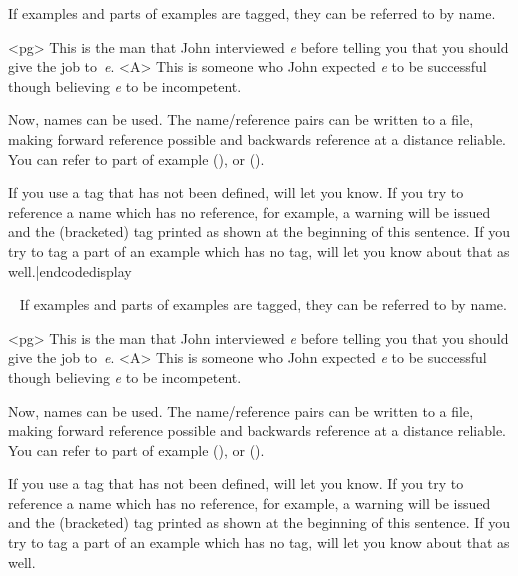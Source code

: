 
\vfil\eject
{}

\codedisplay
If examples and parts of examples are tagged, they can be
referred to by name.

\pex<pg>
\a This is the man that John interviewed {\sl e\/} before
telling you that you should give the job to~{\sl e}.
\a<A> This is someone who John expected {\sl e\/} to be successful
though believing {\sl e\/} to be incompetent.
\xe

Now, names can be used.  The name/reference pairs can be written
to a file, making forward reference possible and backwards
reference at a distance reliable.  You can refer to part
 of example (), or ().

If you use a tag that has not been defined, \expex\/ will
let you know. If you try to reference a name which has no
reference,  for example, a warning will be issued
and the (bracketed) tag printed as shown at the beginning of this
sentence.  If you try to tag a part of an example which has no
tag, \expex\/ will let you know about that as
well.|endcodedisplay

\framedisplay~
\bigskip
If examples and parts of examples are tagged, they can be
referred to by name.

\pex<pg>
\a This is the man that John interviewed {\sl e\/} before
telling you that you should give the job to~{\sl e}.
\a<A> This is someone who John expected {\sl e\/} to be successful
though believing {\sl e\/} to be incompetent.
\xe

Now, names can be used.  The name/reference pairs can be written
to a file, making forward reference possible and backwards
reference at a distance reliable.  You can refer to part
 of example (), or ().

If you use a tag that has not been defined, \expex\/ will
let you know. If you try to reference a name which has no
reference,  for example, a warning will be issued
and the (bracketed) tag printed as shown at the beginning of this
sentence.  If you try to tag a part of an example which has no
tag, \expex\/ will let you know about that as
well.
\bigskip
\endframedisplay
